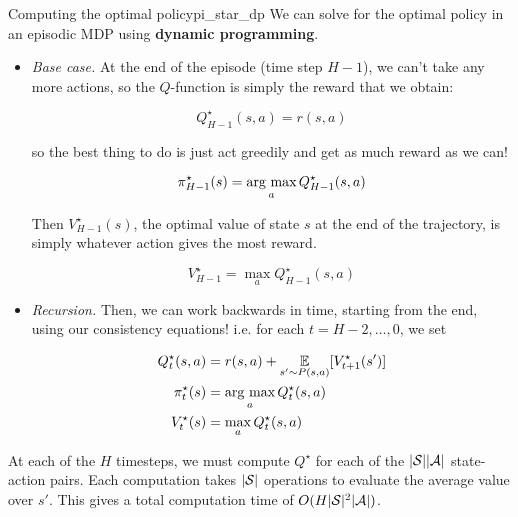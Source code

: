 \documentclass[../main/main]{subfiles}
\begin{document}
\begin{theorem}{Computing the optimal policy}{pi_star_dp}
    We can solve for the optimal policy in an episodic MDP using \textbf{dynamic programming}.
    
    \begin{itemize}
    \item \emph{Base case.} At the end of the episode (time step $H-1$),
        we can't take any more actions, so the $Q$-function is simply the reward
        that we obtain:
    
        \[
            Q^\star_{H-1}(s, a) = r(s, a)
        \]
    
        so the best thing to do is just act greedily
        and get as much reward as we can!
    
        \[
            \pi^\star_{H-1}(s) = \argmax_a Q^\star_{H-1}(s, a)
        \]
    
        Then $V^\star_{H-1}(s)$, the optimal value of state $s$ at the end of the
        trajectory, is simply whatever action gives the most reward.
    
        \[
            V^\star_{H-1} = \max_a Q^\star_{H-1}(s, a)
        \]
    
    \item \emph{Recursion.} Then, we can work backwards in time, starting from the
        end, using our consistency equations! i.e. for each $t = H-2, \dots, 0$, we set

        \begin{align*}
            Q^\star_{t}(s, a) &= r(s, a) + \E_{s' \sim P(s, a)} [V^\star_{t+1}(s')] \\
            \pi^\star_{t}(s) &= \argmax_a Q^\star_{t}(s, a) \\
            V^\star_{t}(s) &= \max_a Q^\star_{t}(s, a)
        \end{align*}
    \end{itemize}
    
    
    
    
    At each of the $H$ timesteps, we must compute $Q^{\star}$ for each of the $|\S| |\A|$ state-action pairs. Each computation takes $|\S|$ operations to evaluate the average value over $s'$. This gives a total computation time of $O(H |\S|^2 |\A|)$.
\end{theorem}
\end{document}
